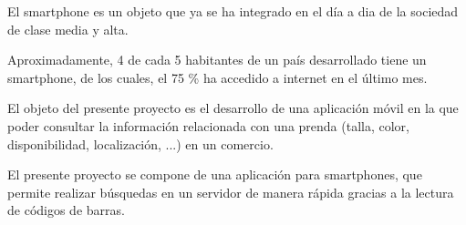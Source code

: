 \minitoc

El smartphone es un objeto que ya se ha integrado en el día a dia de la sociedad de clase media y alta.

Aproximadamente, 4 de cada 5 habitantes de un país desarrollado tiene un smartphone, de los cuales, el 75 \% ha accedido a internet en el último mes.


El objeto del presente proyecto es el desarrollo de una aplicación móvil en la que poder consultar la información relacionada con una prenda (talla, color, disponibilidad, localización, ...) en un comercio.


El presente proyecto se compone de una aplicación para smartphones, que permite realizar búsquedas en un servidor de manera rápida gracias a la lectura de códigos de barras.


\chapterend